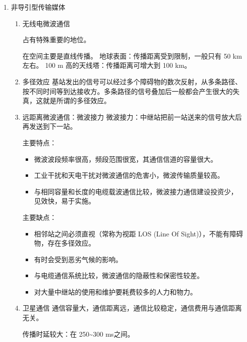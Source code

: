\documentclass[11pt]{article}
\begin{document}
\begin{enumerate}
\begin{enumerate}
\begin{enumerate}
\begin{itemize}
\item 体积小，重量轻。
\end{itemize}
\end{enumerate}
\end{enumerate}

\item 非导引型传输媒体
\label{sec:orgcf5129a}

\begin{enumerate}
\item 无线电微波通信

占有特殊重要的地位。

在空间主要是直线传播。
地球表面：传播距离受到限制，一般只有 50 km左右。
100 m 高的天线塔：传播距离可增大到 100 km。

\item 多径效应
基站发出的信号可以经过多个障碍物的数次反射，从多条路径、按不同时间等到达接收方。多条路径的信号叠加后一般都会产生很大的失真，这就是所谓的多径效应。

\item 远距离微波通信：微波接力
微波接力：中继站把前一站送来的信号放大后再发送到下一站。

主要特点：
\begin{itemize}
\item 微波波段频率很高，频段范围很宽，其通信信道的容量很大。

\item 工业干扰和天电干扰对微波通信的危害小，微波传输质量较高。

\item 与相同容量和长度的电缆载波通信比较，微波接力通信建设投资少，见效快，易于实施。
\end{itemize}

主要缺点：
\begin{itemize}
\item 相邻站之间必须直视（常称为视距 LOS (Line Of Sight)），不能有障碍物，存在多径效应。

\item 有时会受到恶劣气候的影响。

\item 与电缆通信系统比较，微波通信的隐蔽性和保密性较差。

\item 对大量中继站的使用和维护要耗费较多的人力和物力。
\end{itemize}

\item 卫星通信
通信容量大，通信距离远，通信比较稳定，通信费用与通信距离无关。

传播时延较大：在 250\textasciitilde{}300 ms之间。
\end{enumerate}
\end{enumerate}
\end{document}
